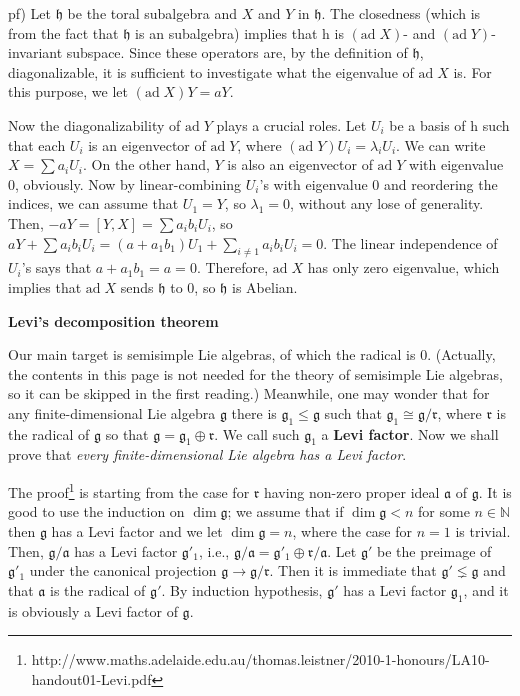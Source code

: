 \documentclass{article}
\newcommand{\NaN}{\mathbb{N}}
\newcommand{\lie}[1]{\mathfrak{#1}}
\newcommand{\ad}[1]{\mathrm{ad}\; #1}
\begin{document}
pf) Let $\lie{h}$ be the toral subalgebra and $X$ and $Y$ in $\lie{h}$.
The closedness (which is from the fact that $\lie{h}$ is an subalgebra) implies that h is $(\ad{X})$- and $(\ad{Y})$-invariant subspace.
Since these operators are, by the definition of $\lie{h}$, diagonalizable, it is sufficient to investigate what the eigenvalue of $\ad{X}$ is.
For this purpose, we let $(\ad{X})Y = aY$.

Now the diagonalizability of $\ad{Y}$ plays a crucial roles.
Let $U_i$ be a basis of h such that each $U_i$ is an eigenvector of $\ad{Y}$, where $(\ad{Y})U_i = \lambda_i U_i$.
We can write $X = \sum a_i U_i$.
On the other hand, $Y$ is also an eigenvector of $\ad{Y}$ with eigenvalue 0, obviously.
Now by linear-combining $U_i$'s with eigenvalue 0 and reordering the indices, we can assume that $U_1 = Y$, so $\lambda_1 = 0$, without any lose of generality.
Then, $-aY = [Y, X] = \sum a_i b_i U_i$, so $aY + \sum a_i b_i U_i = (a+a_1 b_1)U_1 + \sum_{i \ne 1} a_i b_i U_i = 0$.
The linear independence of $U_i$'s says that $a+a_1 b_1 = a = 0$.
Therefore, $\ad{X}$ has only zero eigenvalue, which implies that $\ad{X}$ sends $\lie{h}$ to 0, so $\lie{h}$ is Abelian.

\newpage

\textbf{Levi's decomposition theorem}

Our main target is semisimple Lie algebras, of which the radical is 0.
(Actually, the contents in this page is not needed for the theory of semisimple Lie algebras, so it can be skipped in the first reading.)
Meanwhile, one may wonder that for any finite-dimensional Lie algebra $\lie{g}$ there is $\lie{g}_1 \le \lie{g}$ such that $\lie{g}_1 \cong \lie{g}/\lie{r}$, where $\lie{r}$ is the radical of $\lie{g}$ so that $\lie{g} = \lie{g}_1 \oplus \lie{r}$.
We call such $\lie{g}_1$ a \textbf{Levi factor}.
Now we shall prove that \textit{every finite-dimensional Lie algebra has a Levi factor}.

The proof\footnote{\scriptsize{http://www.maths.adelaide.edu.au/thomas.leistner/2010-1-honours/LA10-handout01-Levi.pdf}} is starting from the case for $\lie{r}$ having non-zero proper ideal $\lie{a}$ of $\lie{g}$.
It is good to use the induction on $\dim{\lie{g}}$; we assume that if $\dim{\lie{g}} < n$ for some $n \in \NaN$ then $\lie{g}$ has a Levi factor and we let $\dim{\lie{g}} = n$, where the case for $n = 1$ is trivial.
Then, $\lie{g}/\lie{a}$ has a Levi factor $\lie{g}'_1$, i.e., $\lie{g}/\lie{a} = \lie{g}'_1 \oplus \lie{r}/\lie{a}$.
Let $\lie{g}'$ be the preimage of $\lie{g}'_1$ under the canonical projection $\lie{g} \to \lie{g}/\lie{r}$.
Then it is immediate that $\lie{g}' \lneq \lie{g}$ and that $\lie{a}$ is the radical of $\lie{g}'$.
By induction hypothesis, $\lie{g}'$ has a Levi factor $\lie{g}_1$, and it is obviously a Levi factor of $\lie{g}$.
\end{document}
